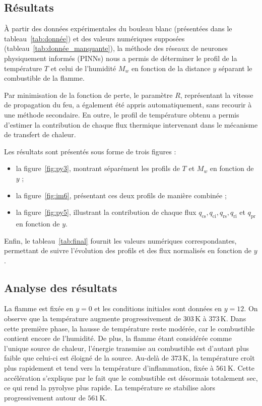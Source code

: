 \documentclass[12pt, oneside]{report} %
\theoremstyle{definition}
\theoremstyle{remark}
\begin{document}
	\subsection{Résultats}
À partir des données expérimentales du bouleau blanc (présentées dans le tableau~\ref{tab:donnée}) et des valeurs numériques supposées (tableau~\ref{tab:donnée_manquante}),  
la méthode des réseaux de neurones physiquement informés (PINNs) nous a permis de déterminer le profil de la température $T$ et celui de l’humidité $M_w$ en fonction de la distance $y$ séparant le combustible de la flamme.

Par minimisation de la fonction de perte, le paramètre $R$, représentant la vitesse de propagation du feu, a également été appris automatiquement, sans recourir à une méthode secondaire.  
En outre, le profil de température obtenu a permis d’estimer la contribution de chaque flux thermique intervenant dans le mécanisme de transfert de chaleur.

Les résultats sont présentés sous forme de trois figures :
\begin{itemize}
	\item la figure~\ref{fig:py3}, montrant séparément les profils de $T$ et $M_w$ en fonction de $y$ ;
	\item la figure~\ref{fig:im6}, présentant ces deux profils de manière combinée ;
	\item la figure~\ref{fig:py5}, illustrant la contribution de chaque flux $q_{\text{cs}}, q_{\text{ci}}, q_{\text{rs}}, q_{\text{ri}}$ et $q_{\text{pr}}$ en fonction de $y$.
\end{itemize}

Enfin, le tableau~\ref{tab:final} fournit les valeurs numériques correspondantes, permettant de suivre l’évolution des profils et des flux normalisés en fonction de $y$.


\subsection{Analyse des résultats}

La flamme est fixée en $y = 0$ et les conditions initiales sont données en $y = 12$.  
On observe que la température augmente progressivement de $303\,\mathrm{K}$ à $373\,\mathrm{K}$.  
Dans cette première phase, la hausse de température reste modérée, car le combustible contient encore de l’humidité.  
De plus, la flamme étant considérée comme l’unique source de chaleur, l’énergie transmise au combustible est d’autant plus faible que celui-ci est éloigné de la source.
Au-delà de $373\,\mathrm{K}$, la température croît plus rapidement et tend vers la température d’inflammation, fixée à $561\,\mathrm{K}$.  
Cette accélération s’explique par le fait que le combustible est désormais totalement sec, ce qui rend la pyrolyse plus rapide.  
La température se stabilise alors progressivement autour de $561\,\mathrm{K}$.
\end{document}
